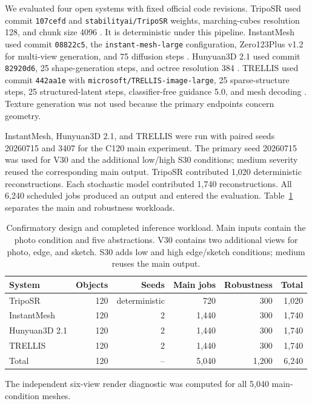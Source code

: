 \documentclass[12pt,a4paper]{article}
\begin{document}
We evaluated four open systems with fixed official code revisions. TripoSR used commit \texttt{107cefd} and \texttt{stabilityai/TripoSR} weights, marching-cubes resolution 128, and chunk size 4096 \parencite{tochilkin2024triposr}. It is deterministic under this pipeline. InstantMesh used commit \texttt{08822c5}, the \texttt{instant-mesh-large} configuration, Zero123Plus v1.2 for multi-view generation, and 75 diffusion steps \parencite{xu2024instantmesh}. Hunyuan3D 2.1 used commit \texttt{82920d6}, 25 shape-generation steps, and octree resolution 384 \parencite{hunyuan3d2025}. TRELLIS used commit \texttt{442aa1e} with \texttt{microsoft/TRELLIS-image-large}, 25 sparse-structure steps, 25 structured-latent steps, classifier-free guidance 5.0, and mesh decoding \parencite{xiang2025trellis}. Texture generation was not used because the primary endpoints concern geometry.

InstantMesh, Hunyuan3D 2.1, and TRELLIS were run with paired seeds 20260715 and 3407 for the C120 main experiment. The primary seed 20260715 was used for V30 and the additional low/high S30 conditions; medium severity reused the corresponding main output. TripoSR contributed 1,020 deterministic reconstructions. Each stochastic model contributed 1,740 reconstructions. All 6,240 scheduled jobs produced an output and entered the evaluation. Table~\ref{tab:design} separates the main and robustness workloads.

\begin{table}[!ht]
\caption{\label{tab:design}Confirmatory design and completed inference workload. Main inputs contain the photo condition and five abstractions. V30 contains two additional views for photo, edge, and sketch. S30 adds low and high edge/sketch conditions; medium reuses the main output.}
\centering
\begin{threeparttable}
\small
\begin{tabular}{lrrrrr}
\toprule
System & Objects & Seeds & Main jobs & Robustness & Total \\
\midrule
TripoSR & 120 & deterministic & 720 & 300 & 1,020 \\
InstantMesh & 120 & 2 & 1,440 & 300 & 1,740 \\
Hunyuan3D 2.1 & 120 & 2 & 1,440 & 300 & 1,740 \\
TRELLIS & 120 & 2 & 1,440 & 300 & 1,740 \\
\midrule
Total & 120 & -- & 5,040 & 1,200 & 6,240 \\
\bottomrule
\end{tabular}
\begin{tablenotes}\footnotesize
\item The independent six-view render diagnostic was computed for all 5,040 main-condition meshes.
\end{tablenotes}
\end{threeparttable}
\end{table}
\end{document}
